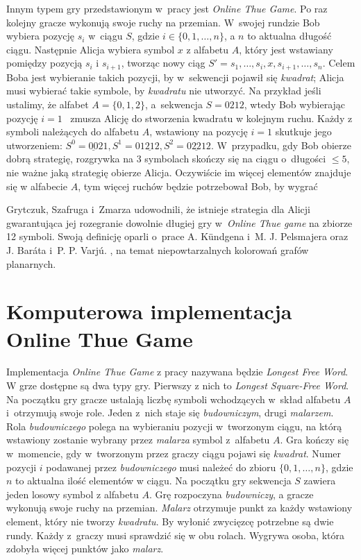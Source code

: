 \documentclass[document]{xmgr}
\begin{document}
Innym typem gry przedstawionym w~pracy \cite{thueonline} jest \emph{Online Thue Game}. Po raz kolejny gracze wykonują swoje ruchy na przemian. W~swojej rundzie Bob wybiera pozycję $s_i$ w~ciągu $S$, gdzie $i \in \{0, 1,\ldots , n\}$, a $n$ to aktualna długość ciągu. Następnie Alicja wybiera symbol $x$ z alfabetu $A$, który jest wstawiany pomiędzy pozycją $s_{i}$ i $s_{i+1}$, tworząc nowy ciąg $S'=s_1, \ldots, s_i, x, s_{i+1}, \ldots, s_n$. Celem Boba jest wybieranie takich pozycji, by w~sekwencji pojawił się \emph{kwadrat}; Alicja musi wybierać takie symbole, by \emph{kwadratu} nie utworzyć. Na przykład jeśli ustalimy, że alfabet $A = \{0, 1, 2\}$, a~sekwencja $S=0212$, wtedy Bob wybierając pozycję $i=1$ ~zmusza Alicję do stworzenia kwadratu w kolejnym ruchu. Każdy z symboli należących do alfabetu $A$, wstawiony na pozycję $i=1$ skutkuje jego utworzeniem: $S^0 = \underline{00}21, S^1=0\underline{1212}, S^2=0\underline{22}12$. W~przypadku, gdy Bob obierze dobrą strategię, rozgrywka na $3$ symbolach skończy się na ciągu o~długości $\leq 5$, nie ważne jaką strategię obierze Alicja. Oczywiście im więcej elementów znajduje się w alfabecie $A$, tym więcej ruchów będzie potrzebował Bob, by wygrać 

Grytczuk, Szafruga i~Zmarza \cite{thueonline} udowodnili, że istnieje strategia dla Alicji gwarantująca jej rozegranie dowolnie długiej gry w~\emph{Online Thue game} na zbiorze 12 symboli. Swoją definicję oparli o~prace A. Kündgena i~M. J. Pelsmajera \cite{first} oraz J. Baráta i~P. P. Varjú. \cite{second}, na temat niepowtarzalnych kolorowań grafów planarnych. 

\section{Komputerowa implementacja Online Thue Game}
Implementacja \emph{Online Thue Game} z pracy \cite{thueonline}  nazywana będzie \emph{Longest Free Word}. W grze dostępne są dwa typy gry. Pierwszy z nich to \emph{Longest Square-Free Word}. Na początku gry gracze ustalają liczbę symboli wchodzących w~skład alfabetu $A$ i~otrzymują swoje role. Jeden z~nich staje się \emph{budowniczym}, drugi \emph{malarzem}. Rola \emph{budowniczego} polega na wybieraniu pozycji w~tworzonym ciągu, na którą wstawiony zostanie wybrany przez \emph{malarza} symbol z~alfabetu $A$. Gra kończy się w~momencie, gdy w~tworzonym przez graczy ciągu pojawi się \emph{kwadrat}. Numer pozycji $i$ podawanej przez \emph{budowniczego} musi należeć do zbioru $\{0, 1, \ldots, n\}$, gdzie $n$ to aktualna ilość elementów w ciągu. Na początku gry sekwencja $S$ zawiera jeden losowy symbol z alfabetu $A$. Grę rozpoczyna \emph{budowniczy}, a gracze wykonują swoje ruchy na przemian. \emph{Malarz} otrzymuje punkt za każdy wstawiony element, który nie tworzy \emph{kwadratu}. By wyłonić zwycięzcę potrzebne są dwie rundy. Każdy z~graczy musi sprawdzić się w obu rolach. Wygrywa osoba, która zdobyła więcej punktów jako \emph{malarz}.
\end{document}
